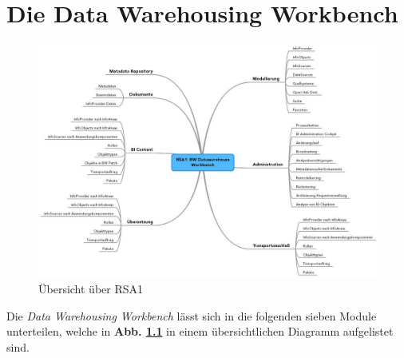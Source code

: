 \chapter{Die Data Warehousing Workbench}
\label{Abschnitt:Motivation}

\begin{figure}[H]
    \centering
    \includegraphics[width=1\textwidth]{files/RSA1Mindmap}
    \caption{Übersicht über RSA1}
    \label{pic:RSA1}
\end{figure}


Die \textit{ Data Warehousing Workbench} lässt sich in die folgenden sieben Module unterteilen, welche in \textbf{Abb. \ref{pic:RSA1}} in einem übersichtlichen Diagramm aufgelistet sind.\\

